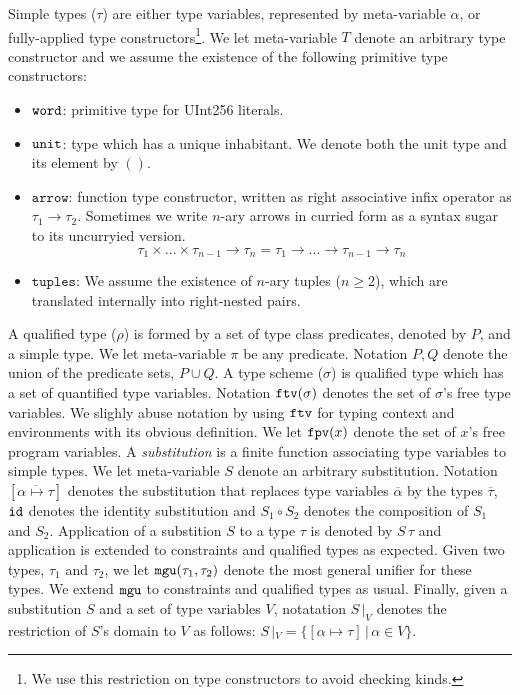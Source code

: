 \documentclass[a4paper, 11pt]{article}
\begin{document}
Simple types ($\tau$) are either type variables, represented by 
meta-variable $\alpha$, or fully-applied type 
constructors\footnote{We use this restriction on type constructors to avoid 
checking kinds.}.
We let meta-variable $T$ denote an arbitrary type constructor and we assume 
the existence of the following primitive type constructors:

\begin{itemize}
  \item $\mathtt{word}$: primitive type for UInt256 literals.
  \item $\mathtt{unit}$: type which has a unique inhabitant. We denote both the 
    unit type and its element by $()$.
  \item $\mathtt{arrow}$: function type constructor, written as right 
    associative infix operator as $\tau_1\to\tau_2$. Sometimes we 
    write $n$-ary arrows in curried form as a syntax sugar to its 
    uncurryied version.
    \[ 
      \tau_1 \times ... \times \tau_{n - 1} \to \tau_n = \tau_1 \to ... \to \tau_{n - 1} \to \tau_n
    \]
  \item $\mathtt{tuples}$: We assume the existence of $n$-ary tuples ($n\geq 2$),
    which are translated internally into right-nested pairs.
\end{itemize}

A qualified type ($\rho$) is formed by a set of 
type class predicates, denoted by $P$, and a 
simple type. We let meta-variable $\pi$ be any predicate. 
Notation $P,Q$ denote the union of the predicate sets, $P\cup Q$.
A type scheme ($\sigma$) is qualified type 
which has a set of quantified type variables.
Notation $\mathtt{ftv}(\sigma)$ denotes the set of $\sigma$'s free type variables.
We slighly abuse notation by using $\mathtt{ftv}$ for typing context 
and environments with its obvious definition. We let $\mathtt{fpv}(x)$ denote 
the set of $x$'s free program variables. A \emph{substitution} is a 
finite function associating type variables 
to simple types. We let meta-variable $S$ denote an arbitrary 
substitution. Notation $[\overline{\alpha \mapsto \tau}]$ 
denotes the substitution that replaces type variables $\overline{\alpha}$
by the types $\overline{\tau}$, $\mathtt{id}$ denotes the identity substitution 
and $S_1 \circ S_2$ denotes the composition of $S_1$ and $S_2$.
Application of a substition $S$ to a type $\tau$ is denoted by $S\,\tau$ and 
application is extended to constraints and qualified types as 
expected. Given two types, $\tau_1$ and $\tau_2$, we let 
$\mathtt{mgu}(\tau_1,\tau_2)$ denote the most general unifier for these types. 
We extend $\mathtt{mgu}$ to constraints and qualified types as usual.
Finally, given a substitution $S$ and a set of type variables 
$V$, notatation $S\,|_{V}$ denotes the restriction of $S$'s domain 
to $V$ as follows: $S\,|_{V} = \{[\alpha\mapsto \tau]\,|\,\alpha\in V\}$.
\end{document}
